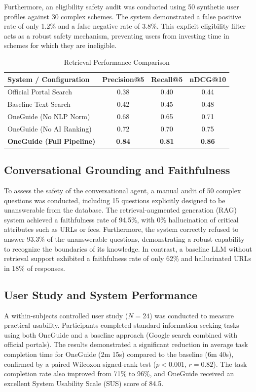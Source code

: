\documentclass[conference]{IEEEtran}
\begin{document}
Furthermore, an eligibility safety audit was conducted using 50 synthetic user profiles against 30 complex schemes. The system demonstrated a false positive rate of only 1.2\% and a false negative rate of 3.8\%. This explicit eligibility filter acts as a robust safety mechanism, preventing users from investing time in schemes for which they are ineligible.

\begin{table}[t]
\caption{Retrieval Performance Comparison}
\label{tab:retrieval}
\centering
\begin{tabular}{l c c c}
\toprule
\textbf{System / Configuration} & \textbf{Precision@5} & \textbf{Recall@5} & \textbf{nDCG@10} \\
\midrule
Official Portal Search & 0.38 & 0.40 & 0.44 \\
Baseline Text Search & 0.42 & 0.45 & 0.48 \\
OneGuide (No NLP Norm) & 0.68 & 0.65 & 0.71 \\
OneGuide (No AI Ranking) & 0.72 & 0.70 & 0.75 \\
\textbf{OneGuide (Full Pipeline)} & \textbf{0.84} & \textbf{0.81} & \textbf{0.86} \\
\bottomrule
\end{tabular}
\end{table}

\subsection{Conversational Grounding and Faithfulness}
To assess the safety of the conversational agent, a manual audit of 50 complex questions was conducted, including 15 questions explicitly designed to be unanswerable from the database. The retrieval-augmented generation (RAG) system achieved a faithfulness rate of 94.5\%, with 0\% hallucination of critical attributes such as URLs or fees. Furthermore, the system correctly refused to answer 93.3\% of the unanswerable questions, demonstrating a robust capability to recognize the boundaries of its knowledge. In contrast, a baseline LLM without retrieval support exhibited a faithfulness rate of only 62\% and hallucinated URLs in 18\% of responses.

\subsection{User Study and System Performance}
A within-subjects controlled user study ($N=24$) was conducted to measure practical usability. Participants completed standard information-seeking tasks using both OneGuide and a baseline approach (Google search combined with official portals). The results demonstrated a significant reduction in average task completion time for OneGuide (2m 15s) compared to the baseline (6m 40s), confirmed by a paired Wilcoxon signed-rank test ($p < 0.001$, $r = 0.82$). The task completion rate also improved from 71\% to 96\%, and OneGuide received an excellent System Usability Scale (SUS) score of 84.5.
\end{document}
